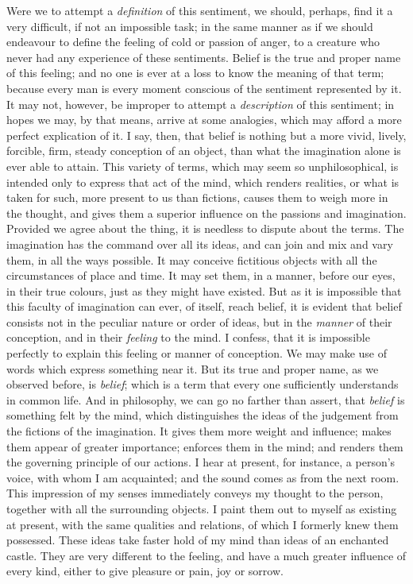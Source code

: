 \documentclass[]{article}
\begin{document}
\begin{sectionbody}
\humeparagraph  Were we to attempt a \emph{definition} of this sentiment, we should, perhaps, find it a very difficult, if not an impossible task; in the same manner as if we should endeavour to define the feeling of cold or passion of anger, to a creature who never had any experience of these sentiments. Belief is the true and proper name of this feeling; and no one is ever at a loss to know the meaning of that term; because every man is every moment conscious of the sentiment represented by it. It may not, however, be improper to attempt a \emph{description} of this sentiment; in hopes we may, by that means, arrive at some analogies, which may afford a more perfect explication of it. I say, then, that belief is nothing but a more vivid, lively, forcible, firm, steady conception of an object, than what the imagination alone is ever able to attain. This variety of terms, which may seem so unphilosophical, is intended only to express that act of the mind, which renders realities, or what is taken for such, more present to us than fictions, causes them to weigh more in the thought, and gives them a superior influence on the passions and imagination. Provided we agree about the thing, it is needless to dispute about the terms. The imagination has the command over all its ideas, and can join and mix and vary them, in all the ways possible. It may conceive fictitious objects with all the circumstances of place and time. It may set them, in a manner, before our eyes, in their true colours, just as they might have existed. But as it is impossible that this faculty of imagination can ever, of itself, reach belief, it is evident that belief consists not in the peculiar nature or order of ideas, but in the \emph{manner} of their conception, and in their \emph{feeling} to the mind. I confess, that it is impossible perfectly to explain this feeling or manner of conception. We may make use of words which express something near it. But its true and proper name, as we observed before, is \emph{belief}; which is a term that every one sufficiently understands in common life. And in philosophy, we can go no farther than assert, that \emph{belief} is something felt by the mind, which distinguishes the ideas of the judgement from the fictions of the imagination. It gives them more weight and influence; makes them appear of greater importance; enforces them in the mind; and renders them the governing principle of our actions. I hear at present, for instance, a person's voice, with whom I am acquainted; and the sound comes as from the next room. This impression of my senses immediately conveys my thought to the person, together with all the surrounding objects. I paint them out to myself as existing at present, with the same qualities and relations, of which I formerly knew them possessed. These ideas take faster hold of my mind than ideas of an enchanted castle. They are very different to the feeling, and have a much greater influence of every kind, either to give pleasure or pain, joy or sorrow.


\end{sectionbody}
\end{document}
